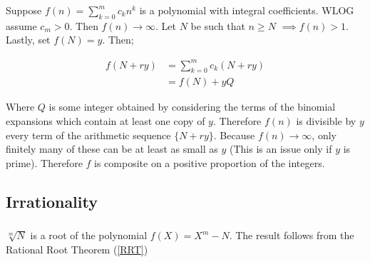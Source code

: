 Suppose $f(n) = \sum_{k=0}^m c_k n^k $ is a polynomial with 
integral coefficients. WLOG assume $c_m > 0$. Then $f(n) \to \infty$. 
Let $N$ be such that $n\geq N$ $\implies f(n) > 1$. Lastly, 
set $f(N) = y$. Then;

\begin{align*}
    f(N + ry) &= \sum_{k=0}^m c_k (N + ry) \\
    &= f(N) + yQ
\end{align*}

Where $Q$ is some integer obtained by considering the terms of the 
binomial expansions which contain at least one copy of $y$. 
Therefore $f(n)$ is divisible by $y$ every term of the arithmetic 
sequence $\{N + ry\}$. Because $f(n) \to \infty$, only finitely 
many of these can be at least as small as $y$ (This is an issue 
only if $y$ is prime). Therefore $f$ is composite on a 
positive proportion of the integers.

\subsection{Irrationality}
\subsubsection{}
$\sqrt[m]{N}$ is a root of the polynomial $f(X) = X^m - N$. The result follows from the Rational Root Theorem (\ref{RRT})